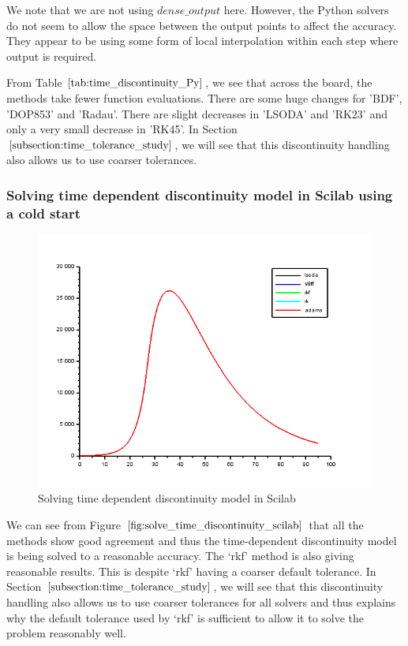We note that we are not using $dense\_output$ here. However, the Python solvers do not seem to allow the space between the output points to affect the accuracy. They appear to be using some form of local interpolation within each step where output is required.

From Table $\ref{tab:time_discontinuity_Py}$, we see that across the board, the methods take fewer function evaluations. There are some huge changes for 'BDF', 'DOP853' and 'Radau'. There are slight decreases in 'LSODA' and 'RK23' and only a very small decrease in 'RK45'. In Section $\ref{subsection:time_tolerance_study}$, we will see that this discontinuity handling also allows us to use coarser tolerances.

\subsubsection{Solving time dependent discontinuity model in Scilab using a cold start} 
\begin{figure}[h]
\centering
\includegraphics[width=0.7\linewidth]{./figures/solve_time_discontinuity_scilab}
\caption{Solving time dependent discontinuity model in Scilab}
\label{fig:solve_time_discontinuity_scilab}
\end{figure}
We can see from Figure $\ref{fig:solve_time_discontinuity_scilab}$ that all the methods show good agreement and thus the time-dependent discontinuity model is being solved to a reasonable accuracy. The `rkf' method is also giving reasonable results. This is despite `rkf' having a coarser default tolerance. In Section $\ref{subsection:time_tolerance_study}$, we will see that this discontinuity handling also allows us to use coarser tolerances for all solvers and thus explains why the default tolerance used by `rkf' is sufficient to allow it to solve the problem reasonably well.

